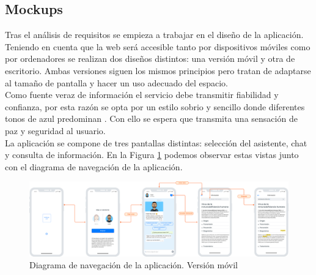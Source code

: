


\subsection{Mockups}
\label{mockups}
Tras el análisis de requisitos se empieza a trabajar en el diseño de la aplicación. Teniendo en cuenta que la web será accesible tanto por dispositivos móviles como por ordenadores se realizan dos diseños distintos: una versión móvil y otra de escritorio. Ambas versiones siguen los mismos principios pero tratan de adaptarse al tamaño de pantalla y hacer un uso adecuado del espacio.\\

Como fuente veraz de información el servicio debe transmitir fiabilidad y confianza, por esta razón se opta por un estilo sobrio y sencillo donde diferentes tonos de azul predominan \cite{colors}. Con ello se espera que transmita una sensación de paz y seguridad al usuario.\\

La aplicación se compone de tres pantallas distintas: selección del asistente, chat y consulta de información. En la Figura \ref{fig:mobile flow} podemos observar estas vistas junto con el diagrama de navegación de la aplicación. \\

\begin{figure}[htbp]
\centering
\includegraphics[scale=0.1]{../images/mobile_flow.png} 
\caption{Diagrama de navegación de la aplicación. Versión móvil}
\label{fig:mobile flow}
\end{figure}

